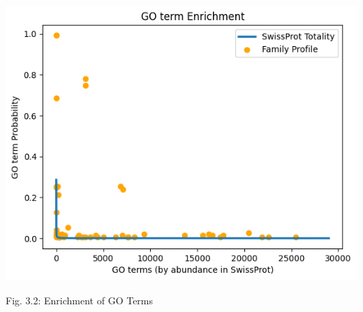 \documentclass[10pt,twocolumn,letterpaper]{article}
\begin{document}
\begin{center}
    \includegraphics[scale=0.4]{report/img/go_term_enrichment.png}
\end{center}

\begin{center}
    \small{Fig. 3.2: Enrichment of GO Terms}
\end{center}
\end{document}
